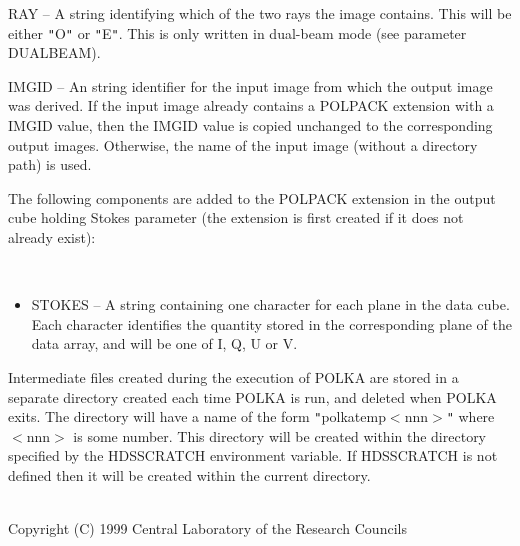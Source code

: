 \documentclass[twoside,11pt]{article}
\renewcommand{\_}{\texttt{\symbol{95}}}
\newcommand{\sstdiytopic}[2]{\item[{\hspace{-0.35em}#1\hspace{-0.35em}:}]
\mbox{} \\[1.3ex] #2}
\newcommand{\sstitemlist}[1]{
  \mbox{} \\
  \vspace{-3.5ex}
  \begin{itemize}
     #1
  \end{itemize}
}
\newcommand{\sstitem}{\item}
\newcommand{\sstdiytopic}[2]{\item[{#1}] #2 }
\newcommand{\sstitemlist}[1]{
      \begin{itemize}
         #1
      \end{itemize}
      \\
   }
\newcommand{\sstitem}{\item}
\begin{document}
{{{{            \sstitem
              RAY -- A string identifying which of the two rays the image
              contains. This will be either {\tt "}O{\tt "} or {\tt "}E{\tt "}. This is only written in
              dual-beam mode (see parameter DUALBEAM).
   
            \sstitem
              IMGID -- An string identifier for the input image from which the
              output image was derived. If the input image already contains a
              POLPACK extension with a IMGID value, then the IMGID value is copied
              unchanged to the corresponding output images. Otherwise, the name of
              the input image (without a directory path) is used.
         }

         \sstitem
         The following components are added to the POLPACK extension in the
         output cube holding Stokes parameter (the extension is first created
         if it does not already exist):

         \sstitemlist{

            \sstitem
              STOKES -- A string containing one character for each plane in
              the data cube. Each character identifies the quantity
              stored in the corresponding plane of the data array, and will be one
              of I, Q, U or V.
         }

         \sstitem
         Intermediate files created during the execution of POLKA are stored
         in a separate directory created each time POLKA is run, and deleted
         when POLKA exits. The directory will have a name of the form
         {\tt "}polka\_temp\_$<$nnn$>${\tt "} where $<$nnn$>$ is some number. This directory will be
         created within the directory specified by the HDS\_SCRATCH environment
         variable. If HDS\_SCRATCH is not defined then it will be created within
         the current directory.
      }
   }
   \sstdiytopic{
      Copyright
   }{
      Copyright (C) 1999 Central Laboratory of the Research Councils
   }
}
\end{document}
